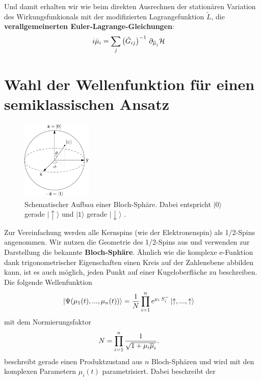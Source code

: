 Und damit erhalten wir wie beim direkten Ausrechnen der stationären Variation des Wirkungsfunkionals mit der modifizierten 
Lagrangefunktion $\widetilde{L}$, die \textbf{verallgemeinerten Euler-Lagrange-Gleichungen}:
\begin{align}\label{verallgemeinerter_Euler_Lagrange}
    i\dot{\mu}_i &= \sum_{j}\left(\tilde{G}_{ij}\right)^{-1}\thinspace \partial_{\overline{\mu}_j}\mathcal{{H}}
\end{align}
\newpage
\section{Wahl der Wellenfunktion für einen semiklassischen Ansatz}
\begin{figure}
    \centering
    \includegraphics[width = 0.3\textwidth]{Abbildungen/Bloch_sphere_wikimedia.png}
    \caption{Schematischer Aufbau einer Bloch-Sphäre. Dabei entspricht $|0\rangle$  gerade $|\uparrow\rangle$ und $|1\rangle$ gerade 
    $|\downarrow\rangle$ \cite{pict}.}
    \label{fig:qubit}
\end{figure}
Zur Vereinfachung werden alle Kernspins (wie der Elektronenspin) als 1/2-Spins angenommen. 
Wir nutzen die Geometrie des 1/2-Spins aus und verwenden zur Darstellung die bekannte \textbf{Bloch-Sphäre}. 
Ähnlich wie die komplexe e-Funktion dank trigonometrischer Eigenschaften einen Kreis auf der Zahlenebene abbilden kann, ist es auch möglich,
jeden Punkt auf einer Kugeloberfläche zu beschreiben. Die folgende Wellenfunktion 
\begin{align}\label{klassischer_Ansatz}
    \ket{\Psi(\mu_1(t),...,\mu_n(t))} &= \frac{1}{N}\prod_{i=1}^{n} e^{\mu_i\thinspace S_i^-}\ket{\uparrow,...,\uparrow}
\end{align}
mit dem Normierungsfaktor
\begin{align}
    N &= \prod_{i=1}^{n} \frac{1}{\sqrt{1+\mu_i\overline{\mu}_i}}.
\end{align}
beschreibt gerade einen Produktzustand aus $n$ Bloch-Sphären und wird mit den komplexen Parametern $\mu_i(t)$ parametrisiert. Dabei beschreibt der

